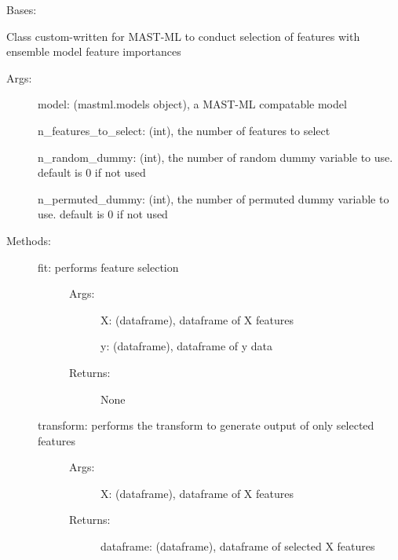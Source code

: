 \documentclass[letterpaper,10pt,english]{sphinxmanual}
\begin{document}
\begin{fulllineitems}
\label{\detokenize{api/mastml.feature_selectors.EnsembleModelFeatureSelector:mastml.feature_selectors.EnsembleModelFeatureSelector}}
Bases: {\hyperref[\detokenize{api/mastml.feature_selectors.BaseSelector:mastml.feature_selectors.BaseSelector}]{}}

Class custom-written for MAST-ML to conduct selection of features with ensemble model feature importances
\begin{description}
\item[{Args:}] \leavevmode
model: (mastml.models object), a MAST-ML compatable model

n\_features\_to\_select: (int), the number of features to select

n\_random\_dummy: (int), the number of random dummy variable to use. default is 0 if not used

n\_permuted\_dummy: (int), the number of permuted dummy variable to use. default is 0 if not used

\item[{Methods:}] \leavevmode\begin{description}
\item[{fit: performs feature selection}] \leavevmode\begin{description}
\item[{Args:}] \leavevmode
X: (dataframe), dataframe of X features

y: (dataframe), dataframe of y data

\item[{Returns:}] \leavevmode
None

\end{description}

\item[{transform: performs the transform to generate output of only selected features}] \leavevmode\begin{description}
\item[{Args:}] \leavevmode
X: (dataframe), dataframe of X features

\item[{Returns:}] \leavevmode
dataframe: (dataframe), dataframe of selected X features


\end{description}
\end{description}
\end{description}
\end{fulllineitems}
\end{document}
